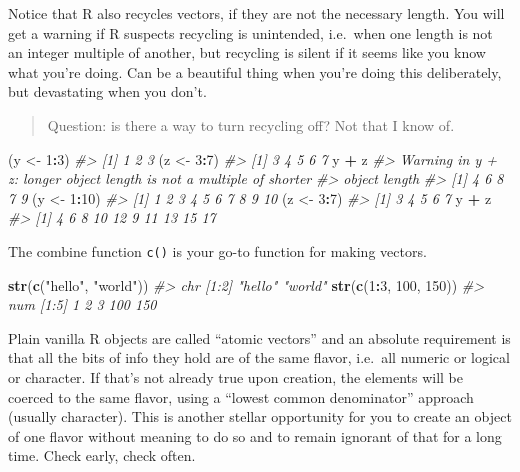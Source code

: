 \documentclass[
]{book}
\newenvironment{Shaded}{\begin{snugshade}}{\end{snugshade}}
\newcommand{\CommentTok}[1]{\textcolor[rgb]{0.56,0.35,0.01}{\textit{#1}}}
\newcommand{\DecValTok}[1]{\textcolor[rgb]{0.00,0.00,0.81}{#1}}
\newcommand{\KeywordTok}[1]{\textcolor[rgb]{0.13,0.29,0.53}{\textbf{#1}}}
\newcommand{\NormalTok}[1]{#1}
\newcommand{\OperatorTok}[1]{\textcolor[rgb]{0.81,0.36,0.00}{\textbf{#1}}}
\newcommand{\StringTok}[1]{\textcolor[rgb]{0.31,0.60,0.02}{#1}}
\begin{document}
Notice that R also recycles vectors, if they are not the necessary length. You will get a warning if R suspects recycling is unintended, i.e.~when one length is not an integer multiple of another, but recycling is silent if it seems like you know what you're doing. Can be a beautiful thing when you're doing this deliberately, but devastating when you don't.

\begin{quote}
Question: is there a way to turn recycling off? Not that I know of.
\end{quote}

\begin{Shaded}
\begin{Highlighting}[]
\NormalTok{(y <-}\StringTok{ }\DecValTok{1}\OperatorTok{:}\DecValTok{3}\NormalTok{)}
\CommentTok{#> [1] 1 2 3}
\NormalTok{(z <-}\StringTok{ }\DecValTok{3}\OperatorTok{:}\DecValTok{7}\NormalTok{)}
\CommentTok{#> [1] 3 4 5 6 7}
\NormalTok{y }\OperatorTok{+}\StringTok{ }\NormalTok{z}
\CommentTok{#> Warning in y + z: longer object length is not a multiple of shorter}
\CommentTok{#> object length}
\CommentTok{#> [1] 4 6 8 7 9}
\NormalTok{(y <-}\StringTok{ }\DecValTok{1}\OperatorTok{:}\DecValTok{10}\NormalTok{)}
\CommentTok{#>  [1]  1  2  3  4  5  6  7  8  9 10}
\NormalTok{(z <-}\StringTok{ }\DecValTok{3}\OperatorTok{:}\DecValTok{7}\NormalTok{)}
\CommentTok{#> [1] 3 4 5 6 7}
\NormalTok{y }\OperatorTok{+}\StringTok{ }\NormalTok{z}
\CommentTok{#>  [1]  4  6  8 10 12  9 11 13 15 17}
\end{Highlighting}
\end{Shaded}

The combine function \texttt{c()} is your go-to function for making vectors.

\begin{Shaded}
\begin{Highlighting}[]
\KeywordTok{str}\NormalTok{(}\KeywordTok{c}\NormalTok{(}\StringTok{"hello"}\NormalTok{, }\StringTok{"world"}\NormalTok{))}
\CommentTok{#>  chr [1:2] "hello" "world"}
\KeywordTok{str}\NormalTok{(}\KeywordTok{c}\NormalTok{(}\DecValTok{1}\OperatorTok{:}\DecValTok{3}\NormalTok{, }\DecValTok{100}\NormalTok{, }\DecValTok{150}\NormalTok{))}
\CommentTok{#>  num [1:5] 1 2 3 100 150}
\end{Highlighting}
\end{Shaded}

Plain vanilla R objects are called ``atomic vectors'' and an absolute requirement is that all the bits of info they hold are of the same flavor, i.e.~all numeric or logical or character. If that's not already true upon creation, the elements will be coerced to the same flavor, using a ``lowest common denominator'' approach (usually character). This is another stellar opportunity for you to create an object of one flavor without meaning to do so and to remain ignorant of that for a long time. Check early, check often.
\end{document}
